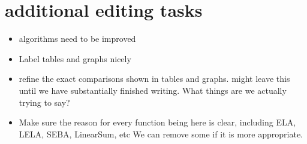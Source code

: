  
 
\section*{additional editing tasks}
\begin{itemize}
    \item algorithms need to be improved
    \item Label tables and graphs nicely
    \item refine the exact comparisons shown in tables and graphs. might leave this until we have substantially finished writing. What things are we actually trying to say?
    \item Make sure the reason for every function being here is clear, including ELA, LELA, SEBA, LinearSum, etc We can remove some if it is more appropriate.
    
\end{itemize}
 